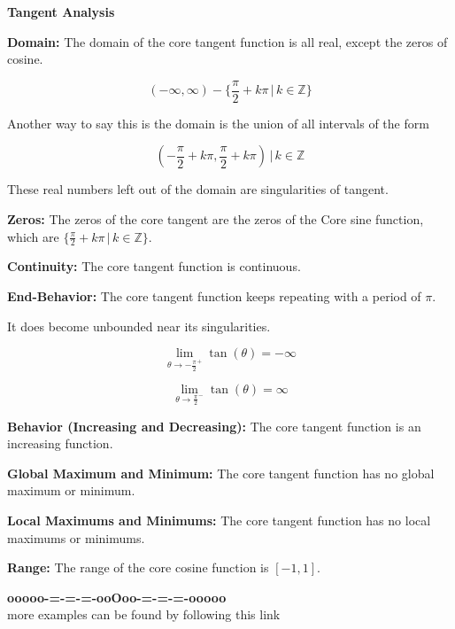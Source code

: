 \documentclass{ximera}
\begin{document}
\begin{summary} \textbf{\textcolor{red!70!yellow}{Tangent Analysis}}


\textbf{Domain:} The domain of the core tangent function is all real, except the zeros of cosine. 

\[ (-\infty, \infty) -  \{ \frac{\pi}{2}  + k\pi \, | \, k \in \mathbb{Z} \} \]


Another way to say this is the domain is the union of all intervals of the form 

\[ \left(  -\frac{\pi}{2}  + k\pi, \frac{\pi}{2}  + k\pi   \right) \, | \, k \in \mathbb{Z}   \]


These real numbers left out of the domain are singularities of tangent.



\textbf{Zeros:} The zeros of the core tangent are the zeros of the Core sine function, which are $\{ \frac{\pi}{2}  + k\pi \, | \, k \in \mathbb{Z} \}$.

\textbf{Continuity:} The core tangent function is continuous.

\textbf{End-Behavior:} The core tangent function keeps repeating with a period of $\pi$.

It does become unbounded near its singularities.


\[
\lim\limits_{\theta \to -\frac{\pi}{2}^+} \tan(\theta) = -\infty
\]


\[
\lim\limits_{\theta \to \frac{\pi}{2}^-} \tan(\theta) = \infty
\]





\textbf{Behavior (Increasing and Decreasing):} The core tangent function is an increasing function.





\textbf{Global Maximum and Minimum:} The core tangent function has no global maximum or minimum.




\textbf{Local Maximums and Minimums:}  The core tangent function has no local maximums or minimums.




\textbf{Range:} The range of the core cosine function is $[-1, 1]$.


\end{summary}
































\begin{center}
\textbf{\textcolor{green!50!black}{ooooo-=-=-=-ooOoo-=-=-=-ooooo}} \\

more examples can be found by following this link\\ 

\end{center}
\end{document}
